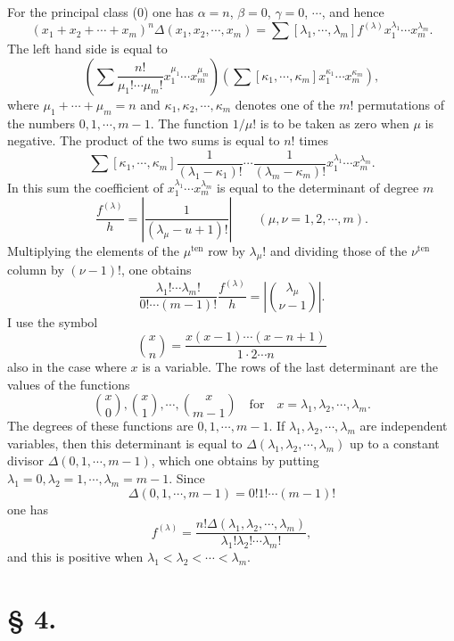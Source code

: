 \documentclass[11pt]{article}
\newcommand{\ten}{\mathrm{ten}}
\begin{document}
For the principal class (0) one has $\alpha=n$, $\beta=0$, $\gamma=0$, $\cdots$, and hence
\begin{equation}\tag{5.}
 (x_1+x_2+\cdots+x_m)^n\Delta(x_1,x_2,\cdots,x_m)=\sum[\lambda_1,\cdots,
\lambda_m]f^{(\lambda)}x_1^{\lambda_1}\cdots x_m^{\lambda_m}.
\end{equation}
The left hand side is equal to
\[
 \left(\sum \frac{n!}{\mu_1!\cdots\mu_m!}x_1^{\mu_1}\cdots x_m^{\mu_m}\right)
 \left(\sum[\kappa_1,\cdots,
\kappa_m]x_1^{\kappa_1}\cdots x_m^{\kappa_m}\right),
\]
where $\mu_1+\cdots+\mu_m=n$ and $\kappa_1,\kappa_2,\cdots,
\kappa_m$ denotes one of the $m!$ permutations of the numbers $0,1,\cdots,m-1$. The function $1/\mu!$ is to be taken as zero when $\mu$ is negative. The product of the two sums is equal to $n!$ times
\[
 \sum[\kappa_1,
\cdots,
\kappa_m]\frac{1}{(\lambda_1-
\kappa_1)!}\cdots\frac{1}{(\lambda_m-
\kappa_m)!}x_1^{\lambda_1}\cdots x_m^{\lambda_m}.
\]
In this sum the coefficient of $x_1^{\lambda_1}\cdots x_m^{\lambda_m}$ is equal to the determinant of degree $m$
\[
 \frac{f^{(\lambda)}}{h}=\left|\frac{1}{(\lambda_\mu-
u+1)!}\right|\qquad(\mu,
\nu=1,2,
\cdots,m).
\]
Multiplying the elements of the $\mu^{\ten}$ row by $\lambda_\mu!$ and dividing those of the $\nu^{\ten}$ column by $(\nu-1)!$, one obtains
\[
 \frac{\lambda_1!\cdots\lambda_m!}{0!\cdots(m-1)!}\frac{f^{(\lambda)}}{h}=\left|\binom{\lambda_\mu}{\nu-1}\right|.
\]
I use the symbol
\[
 \binom{x}{n}=\frac{x(x-1)\cdots(x-n+1)}{1\cdot2\cdots n}
\]
also in the case where $x$ is a variable. The rows of the last determinant are the values of the functions
\[
 \binom{x}{0},\binom{x}{1},\cdots,\binom{x}{m-1}\quad\text{for}\quad x=\lambda_1,\lambda_2,\cdots,
\lambda_m.
\]
The degrees of these functions are $0,1,\cdots,m-1$. If $\lambda_1,\lambda_2,\cdots,\lambda_m$ are independent variables, then this determinant is equal to $\Delta(\lambda_1,\lambda_2,\cdots,\lambda_m)$ up to a constant divisor $\Delta(0,1,\cdots,m-1)$, which one obtains by putting $\lambda_1=0,\lambda_2=1,\cdots,\lambda_m=m-1$. Since
\[
 \Delta(0,1,
\cdots,m-1)=0!1!\cdots(m-1)!
\]
one has
\begin{equation}\tag{6.}
 f^{(\lambda)}=\frac{n!\Delta(\lambda_1,
\lambda_2,
\cdots,
\lambda_m)}{\lambda_1!\lambda_2!\cdots\lambda_m!},
\end{equation}
and this is positive when $\lambda_1<\lambda_2<\cdots<\lambda_m$.


\section*{§ 4.}
\end{document}
